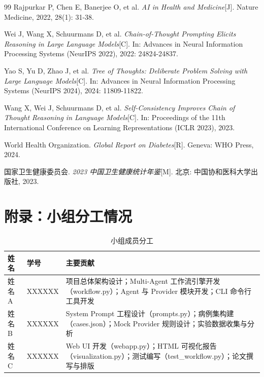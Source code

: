 \documentclass[11pt,a4paper]{ctexart}
\begin{document}
\begin{thebibliography}{99}
Rajpurkar P, Chen E, Banerjee O, et al.
\emph{AI in Health and Medicine}[J].
Nature Medicine, 2022, 28(1): 31-38.

Wei J, Wang X, Schuurmans D, et al.
\emph{Chain-of-Thought Prompting Elicits Reasoning in Large Language Models}[C].
In: Advances in Neural Information Processing Systems (NeurIPS 2022), 2022: 24824-24837.

Yao S, Yu D, Zhao J, et al.
\emph{Tree of Thoughts: Deliberate Problem Solving with Large Language Models}[C].
In: Advances in Neural Information Processing Systems (NeurIPS 2024), 2024: 11809-11822.

Wang X, Wei J, Schuurmans D, et al.
\emph{Self-Consistency Improves Chain of Thought Reasoning in Language Models}[C].
In: Proceedings of the 11th International Conference on Learning Representations (ICLR 2023), 2023.

World Health Organization.
\emph{Global Report on Diabetes}[R].
Geneva: WHO Press, 2024.

国家卫生健康委员会.
\emph{2023 中国卫生健康统计年鉴}[M].
北京: 中国协和医科大学出版社, 2023.

\end{thebibliography}

\newpage
\section*{附录：小组分工情况}

\begin{table}[H]
\centering
\caption{小组成员分工}
\begin{tabularx}{\textwidth}{l|l|X}
\toprule
\textbf{姓名} & \textbf{学号} & \textbf{主要贡献} \\
\midrule
姓名A & XXXXXX & 项目总体架构设计；Multi-Agent 工作流引擎开发（workflow.py）；Agent 与 Provider 模块开发；CLI 命令行工具开发 \\
\hline
姓名B & XXXXXX & System Prompt 工程设计（prompts.py）；病例集构建（cases.json）；Mock Provider 规则设计；实验数据收集与分析 \\
\hline
姓名C & XXXXXX & Web UI 开发（webapp.py）；HTML 可视化报告（visualization.py）；测试编写（test\_workflow.py）；论文撰写与排版 \\
\bottomrule
\end{tabularx}
\end{table}

\vspace{1em}
\end{document}
